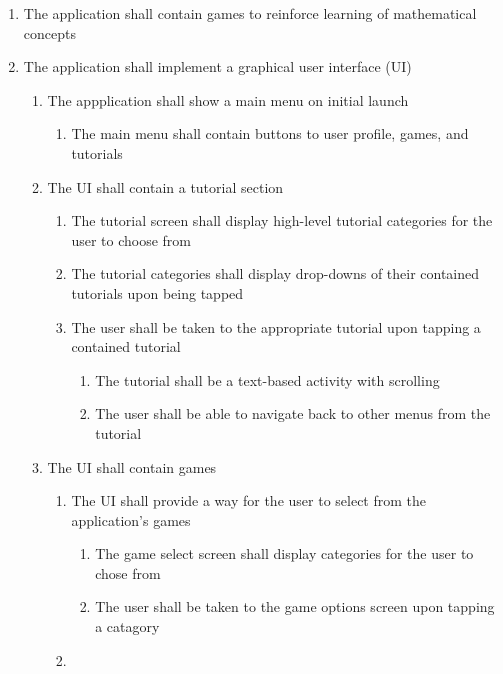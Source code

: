 \documentclass[12pt,letterpaper,oneside]{article}
\begin{document}
\begin{enumerate}
	\item
		The application shall contain games to reinforce learning of mathematical concepts
	\item
		The application shall implement a graphical user interface (UI)
		\begin{enumerate}
			\item
				The appplication shall show a main menu on initial launch
				\begin{enumerate}
					\item
						The main menu shall contain buttons to user profile, games, and tutorials
				\end{enumerate}
			\item
				The UI shall contain a tutorial section
				\begin{enumerate}
					\item
						The tutorial screen shall display high-level tutorial categories for the user to choose from
					\item
						The tutorial categories shall display drop-downs of their contained tutorials upon being tapped
					\item
						The user shall be taken to the appropriate tutorial upon tapping a contained tutorial
						\begin{enumerate}
							\item
								The tutorial shall be a text-based activity with scrolling
							\item
								The user shall be able to navigate back to other menus from the tutorial
						\end{enumerate}
				\end{enumerate}
			\item
				The UI shall contain games
				\begin{enumerate}
					\item
						The UI shall provide a way for the user to select from the application's games
						\begin{enumerate}
							\item
								The game select screen shall display categories for the user to chose from
							\item
								The user shall be taken to the game options screen upon tapping a catagory
						\end{enumerate}
					\item

\end{enumerate}
\end{enumerate}
\end{enumerate}
\end{document}
